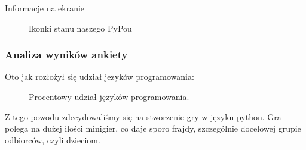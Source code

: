 \documentclass{beamer}
\begin{document}
\begin{frame}{Informacje na ekranie}
    \begin{figure}%
    \centering
    \qquad
    \qquad
    \qquad
    \caption{Ikonki stanu naszego PyPou}%
    \label{fig:example}%
    \end{figure}
\end{frame}

\begin{frame}
\frametitle{Analiza wyników ankiety}
Oto jak rozłożył się udział jezyków programowania:
\begin{figure}[h]
  \centering
  \caption{Procentowy udział j\cite{noauthor_oficjalna_nodate}ęzyków programowania.}
  \label{fig:wykres_kolowy}
\end{figure}
Z tego powodu zdecydowaliśmy się na stworzenie gry w języku python.
Gra polega na dużej ilości minigier, co daje sporo frajdy, szczególnie docelowej grupie odbiorców, czyli dzieciom.
\end{frame}
\end{document}
